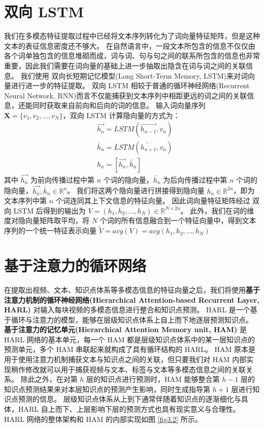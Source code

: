 \section{双向 LSTM}
    我们在多模态特征提取过程中已经将文本序列转化为了词向量特征矩阵，但是这种文本的表征信息密度还不够大。
    在自然语言中，一段文本所包含的信息不仅仅由各个词单独包含的信息堆砌而成，词与词、句与句之间的联系所包含的信息也非常重要，因此我们需要在词向量的基础上进一步抽取出隐含在词与词之间的关联信息。
    我们使用 双向长短期记忆模型(Long Short-Term Memory, LSTM)\cite{Hochreiter1997LongSM}来对词向量进行进一步的特征提取。
    双向 LSTM 相较于普通的循环神经网络(Recurrent Neural Network, RNN)而言不仅能捕获到文本序列中相距更远的词之间的关联信息，还能同时获取来自前向和后向的词的信息。
    输入词向量序列 $\boldsymbol{X} = \{v_1, v_2, \dots, v_N\}$，双向 LSTM 计算隐向量的方式为：
    \begin{equation}
        \begin{aligned}
            &\overrightarrow{h_{n}} = LSTM\left(\overrightarrow{h_{n - 1}}, v_n\right) \\
            &\overleftarrow{h_{n}} = LSTM\left(\overleftarrow{h_{n + 1}}, v_n\right) \\
            &h_n = [\overrightarrow{h_n}, \overleftarrow{h_n}]
        \end{aligned}
    \end{equation}
    其中 $\overrightarrow{h_{n}}$ 为前向传播过程中第 $n$ 个词的隐向量，$\overleftarrow{h_{n}}$ 为后向传播过程中第 $n$ 个词的隐向量，$\overrightarrow{h_{n}}, \overleftarrow{h_{n}} \in \mathbb{R}^{u}$。
    我们将这两个隐向量进行拼接得到隐向量 $h_n \in \mathbb{R}^{2u}$，即为文本序列中第 $n$ 个词连同其上下文信息的特征向量。
    因此词向量特征矩阵经过 双向 LSTM 后得到的输出为 $V = (h_1, h_2, \dots, h_N) \in \mathbb{R}^{N \times 2u}$。
    此外，我们在词的维度对隐向量矩阵取平均，将 $N$ 个词的所有信息融合到一个特征向量中，得到文本序列的一个统一特征表示向量 $\tilde{V} = avg(V) = avg(h_1, h_2, \dots, h_N)$


\section{基于注意力的循环网络}
    在提取出视频、文本、知识点体系等多模态信息的特征向量之后，我们将使用\textbf{基于注意力机制的循环神经网络(Hierarchical Attention-based Recurrent Layer, HARL)}\cite{Huang2019HierarchicalMT} 对输入每块视频的多模态信息进行整合和知识点预测。
    HARL 是一个基于循环与注意力的模型，能够在层级知识点体系上自上而下地逐层预测知识点。
    \textbf{基于注意力的记忆单元(Hierarchical Attention Memory unit, HAM)} 是 HARL 网络的基本单元，每一个 HAM 都是层级知识点体系中的某一层知识点的预测单元，多个 HAM 串联起来就构成了具有循环结构的 HARL。
    HAM 原本是用于使用注意力机制捕获文本与知识点之间的关联，但只要我们对 HAM 内部实现稍作修改就可以用于捕获视频与文本、标签与文本等多模态信息之间的关联关系。
    除此之外，在对第 $h$ 层的知识点进行预测时，HAM 能够整合第 $h - 1$ 层的知识点预测结果来对本层知识点的预测产生影响，同时生成指导第 $h + 1$ 层进行知识点预测的信息。
    层级知识点体系从上到下通常伴随着知识点的逐渐细化与具体，HARL 自上而下、上层影响下层的预测方式也具有现实意义与合理性。
    HARL 网络的整体架构和 HAM 的内部实现如图 \ref{fig3.2} 所示。


